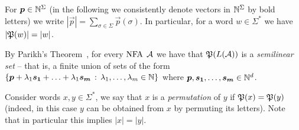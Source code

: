 For $\boldsymbol{p}\in \mathbb{N}^\Sigma$ (in the following we consistently denote vectors in $\mathbb{N}^\Sigma$ by bold letters) we write $|\vec{p}|=\sum_{\sigma\in \Sigma}\vec{p}(\sigma)$. In particular, for a word $w\in \Sigma^*$ we have $|\mathfrak{P}(w)|=|w|$.

By Parikh's Theorem~\cite{Parikh1966}, for every $\mbox{\rm NFA}$ $\mathcal{A}$ we have that $\mathfrak{P}(L(\mathcal{A}))$ is a \emph{semilinear set} -- that is, a finite union of sets of the form $\{\boldsymbol{p}+\lambda_1 \boldsymbol{s_1}+\ldots+\lambda_1 \boldsymbol{s_m}\, :\, \lambda_1,\ldots,\lambda_m\in \mathbb{N}\}$ where $\boldsymbol{p},\boldsymbol{s_1},\ldots,\boldsymbol{s_m}\in \mathbb{N}^d$.

Consider words $x,y\in \Sigma^*$, we say that $x$ is a \emph{permutation} of $y$ if $\mathfrak{P}(x)=\mathfrak{P}(y)$ (indeed, in this case $y$ can be obtained from $x$ by permuting its letters). Note that in particular this implies $|x|=|y|$.
